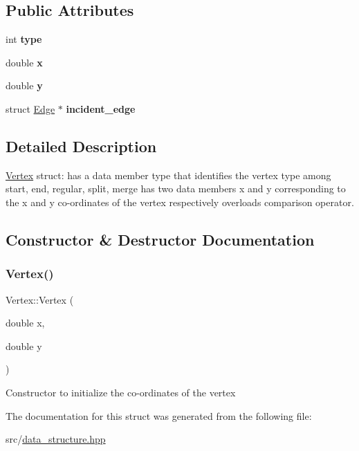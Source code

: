 \subsection*{Public Attributes}
\begin{DoxyCompactItemize}
\item 
\mbox{\label{structVertex_a9bbbbd39330811b13f4a5de0583b84ea}} 
int {\bfseries type}
\item 
\mbox{\label{structVertex_af2602132c3297d81bc9f8ee54867445b}} 
double {\bfseries x}
\item 
\mbox{\label{structVertex_a7563c83da86f4a0831144bc823fec2b0}} 
double {\bfseries y}
\item 
\mbox{\label{structVertex_a668b3aa9231e5aab5799aca4ada528db}} 
struct \hyperlink{structEdge}{Edge} $\ast$ {\bfseries incident\+\_\+edge}
\end{DoxyCompactItemize}


\subsection{Detailed Description}
\hyperlink{structVertex}{Vertex} struct\+: has a data member type that identifies the vertex type among start, end, regular, split, merge has two data members x and y corresponding to the x and y co-\/ordinates of the vertex respectively overloads comparison operator. 

\subsection{Constructor \& Destructor Documentation}
\mbox{\label{structVertex_a2927de87e482ddebbb18abf7f811c6c3}} 
\subsubsection{\texorpdfstring{Vertex()}{Vertex()}}
{\footnotesize\ttfamily Vertex\+::\+Vertex (\begin{DoxyParamCaption}\item[{double}]{x,  }\item[{double}]{y }\end{DoxyParamCaption})\hspace{0.3cm}{\ttfamily [inline]}}

Constructor to initialize the co-\/ordinates of the vertex 

The documentation for this struct was generated from the following file\+:\begin{DoxyCompactItemize}
\item 
src/\hyperlink{data__structure_8hpp}{data\+\_\+structure.\+hpp}\end{DoxyCompactItemize}
